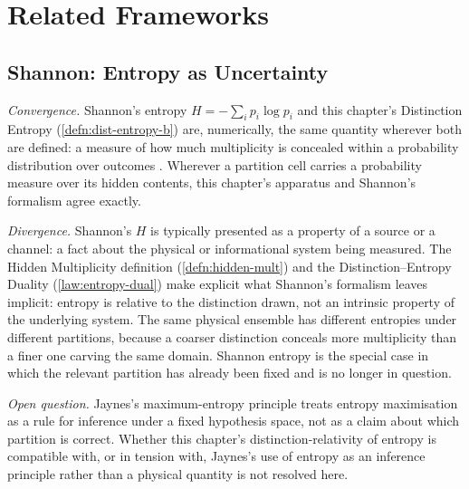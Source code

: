 \documentclass[12pt,twoside,openright]{book}
\begin{document}
\section{Related Frameworks}
\label{sec:ch3-related-frameworks}

\subsection*{Shannon: Entropy as Uncertainty}

\emph{Convergence.} Shannon's entropy
$H = -\sum_i p_i \log p_i$ and this chapter's Distinction
Entropy (\cref{defn:dist-entropy-b}) are, numerically, the same
quantity wherever both are defined: a measure of how much
multiplicity is concealed within a probability distribution
over outcomes \parencite{shannon1948,jaynes1957}. Wherever a
partition cell carries a probability measure over its hidden
contents, this chapter's apparatus and Shannon's formalism
agree exactly.

\emph{Divergence.} Shannon's $H$ is typically presented as a
property of a source or a channel: a fact about the physical or
informational system being measured. The Hidden Multiplicity
definition (\cref{defn:hidden-mult}) and the
Distinction--Entropy Duality (\cref{law:entropy-dual}) make
explicit what Shannon's formalism leaves implicit: entropy is
relative to the distinction drawn, not an intrinsic property of
the underlying system. The same physical ensemble has different
entropies under different partitions, because a coarser
distinction conceals more multiplicity than a finer one carving
the same domain. Shannon entropy is the special case in which
the relevant partition has already been fixed and is no longer
in question.

\emph{Open question.} Jaynes's maximum-entropy principle
\parencite{jaynes1957} treats entropy maximisation as a
rule for inference under a fixed hypothesis space, not as a
claim about which partition is correct. Whether this chapter's
distinction-relativity of entropy is compatible with, or in
tension with, Jaynes's use of entropy as an inference principle
rather than a physical quantity is not resolved here.
\end{document}

